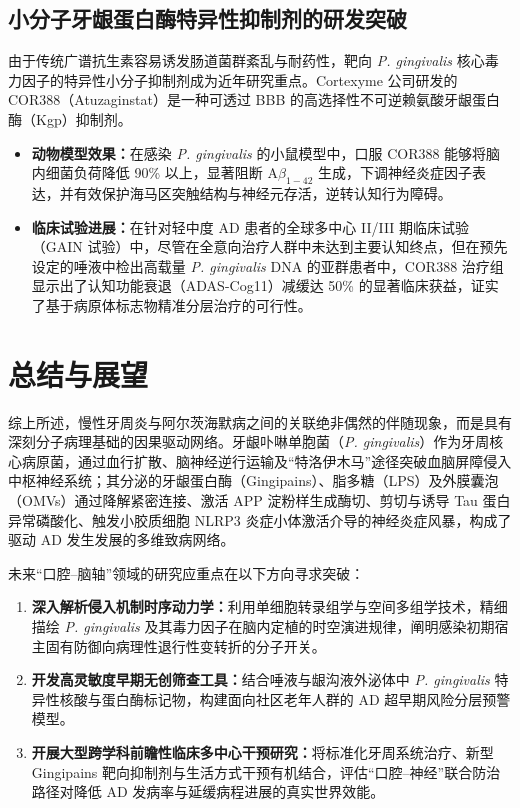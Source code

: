 \documentclass[12pt,a4paper]{ctexart}
\begin{document}
\subsection{小分子牙龈蛋白酶特异性抑制剂的研发突破}
由于传统广谱抗生素容易诱发肠道菌群紊乱与耐药性，靶向 \textit{P. gingivalis} 核心毒力因子的特异性小分子抑制剂成为近年研究重点。Cortexyme 公司研发的 COR388（Atuzaginstat）是一种可透过 BBB 的高选择性不可逆赖氨酸牙龈蛋白酶（Kgp）抑制剂\cite{dominy2019}。
\begin{itemize}
    \item \textbf{动物模型效果：}在感染 \textit{P. gingivalis} 的小鼠模型中，口服 COR388 能够将脑内细菌负荷降低 90\% 以上，显著阻断 A$\beta_{1-42}$ 生成，下调神经炎症因子表达，并有效保护海马区突触结构与神经元存活，逆转认知行为障碍\cite{dominy2019, yuning2018}。
    \item \textbf{临床试验进展：}在针对轻中度 AD 患者的全球多中心 II/III 期临床试验（GAIN 试验）中，尽管在全意向治疗人群中未达到主要认知终点，但在预先设定的唾液中检出高载量 \textit{P. gingivalis} DNA 的亚群患者中，COR388 治疗组显示出了认知功能衰退（ADAS-Cog11）减缓达 50\% 的显著临床获益，证实了基于病原体标志物精准分层治疗的可行性。
\end{itemize}

\section{总结与展望}

综上所述，慢性牙周炎与阿尔茨海默病之间的关联绝非偶然的伴随现象，而是具有深刻分子病理基础的因果驱动网络。牙龈卟啉单胞菌（\textit{P. gingivalis}）作为牙周核心病原菌，通过血行扩散、脑神经逆行运输及“特洛伊木马”途径突破血脑屏障侵入中枢神经系统；其分泌的牙龈蛋白酶（Gingipains）、脂多糖（LPS）及外膜囊泡（OMVs）通过降解紧密连接、激活 APP 淀粉样生成酶切、剪切与诱导 Tau 蛋白异常磷酸化、触发小胶质细胞 NLRP3 炎症小体激活介导的神经炎症风暴，构成了驱动 AD 发生发展的多维致病网络。

未来“口腔--脑轴”领域的研究应重点在以下方向寻求突破：
\begin{enumerate}
    \item \textbf{深入解析侵入机制时序动力学：}利用单细胞转录组学与空间多组学技术，精细描绘 \textit{P. gingivalis} 及其毒力因子在脑内定植的时空演进规律，阐明感染初期宿主固有防御向病理性退行性变转折的分子开关。
    \item \textbf{开发高灵敏度早期无创筛查工具：}结合唾液与龈沟液外泌体中 \textit{P. gingivalis} 特异性核酸与蛋白酶标记物，构建面向社区老年人群的 AD 超早期风险分层预警模型。
    \item \textbf{开展大型跨学科前瞻性临床多中心干预研究：}将标准化牙周系统治疗、新型 Gingipains 靶向抑制剂与生活方式干预有机结合，评估“口腔--神经”联合防治路径对降低 AD 发病率与延缓病程进展的真实世界效能。
\end{enumerate}
\end{document}
